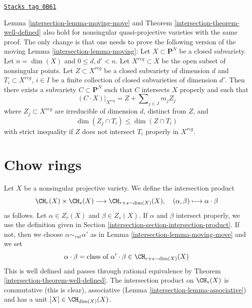 \begin{remark}
\label{intersection-remark-quasi-projective}
\href{https://stacks.math.columbia.edu/tag/0B61}{\texttt{Stacks tag 0B61}}

Lemma \ref{intersection-lemma-moving-move} and
Theorem \ref{intersection-theorem-well-defined}
also hold for nonsingular quasi-projective varieties with
the same proof. The only change is that one needs to prove the following
version of the moving Lemma \ref{intersection-lemma-moving}: Let  $X \subset \mathbf{P}^N$
be a closed subvariety. Let $n = \dim(X)$ and $0 \leq d, d' < n$. Let
$X^{reg} \subset X$ be the open subset of nonsingular points. Let
$Z \subset X^{reg}$ be a closed subvariety of dimension $d$ and
$T_i \subset X^{reg}$, $i \in I$ be a finite collection of closed subvarieties
of dimension $d'$. Then there exists a subvariety $C \subset \mathbf{P}^N$
such that $C$ intersects $X$ properly and such that
$$
(C \cdot X)|_{X^{reg}} = Z + \sum\nolimits_{j \in J} m_j Z_j
$$
where $Z_j \subset X^{reg}$ are irreducible of dimension $d$, distinct
from $Z$, and
$$
\dim(Z_j \cap T_i) \leq \dim(Z \cap T_i)
$$
with strict inequality if $Z$ does not intersect $T_i$ properly in $X^{reg}$.
\end{remark}

\section{Chow rings}
\label{intersection-section-chow-rings}
Let $X$ be a nonsingular projective variety. We define the intersection
product
$$
\CH_r(X) \times \CH_s(X) \longrightarrow \CH_{r + s - \dim(X)}(X),\quad
(\alpha, \beta) \longmapsto \alpha \cdot \beta
$$
as follows. Let $\alpha \in Z_r(X)$ and $\beta \in Z_s(X)$.
If $\alpha$ and $\beta$ intersect properly, we use the
definition given in Section \ref{intersection-section-intersection-product}.
If not, then we choose $\alpha \sim_{rat} \alpha'$ as in
Lemma \ref{intersection-lemma-moving-move} and we set
$$
\alpha \cdot \beta =
\text{class of }\alpha' \cdot \beta \in \CH_{r + s - \dim(X)}(X)
$$
This is well defined and passes through rational equivalence by
Theorem \ref{intersection-theorem-well-defined}. The intersection product
on $\CH_*(X)$ is commutative (this is clear), associative
(Lemma \ref{intersection-lemma-associative}) and has a unit $[X] \in \CH_{\dim(X)}(X)$.

